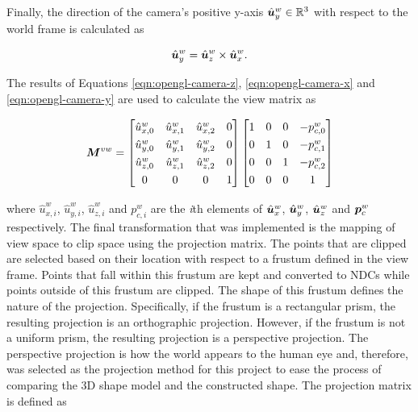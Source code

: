 Finally, the direction of the camera's positive y-axis $\hat{\bm{u}}^w_y\in\mathbb{R}^3$ with respect to the world frame is calculated as

\begin{equation}
	\hat{\bm{u}}^w_y=\hat{\bm{u}}^w_z\times\hat{\bm{u}}^w_x.
	\label{eqn:opengl-camera-y}
\end{equation}

The results of Equations \ref{eqn:opengl-camera-z}, \ref{eqn:opengl-camera-x} and \ref{eqn:opengl-camera-y} are used to calculate the view matrix as

\begin{equation}
	\renewcommand*{\arraystretch}{1.3}
	\matr{M}^{vw}=
	\begin{bmatrix}
		\hat{u}^w_{x,0} & \hat{u}^w_{x,1} & \hat{u}^w_{x,2} & 0 \\
		\hat{u}^w_{y,0} & \hat{u}^w_{y,1} & \hat{u}^w_{y,2} & 0 \\
		\hat{u}^w_{z,0} & \hat{u}^w_{z,1} & \hat{u}^w_{z,2} & 0 \\
		0 & 0 & 0 & 1
	\end{bmatrix}
	\begin{bmatrix}
		1 & 0 & 0 & -p^w_{c,0} \\
		0 & 1 & 0 & -p^w_{c,1} \\
		0 & 0 & 1 & -p^w_{c,2} \\
		0 & 0 & 0 & 1
	\end{bmatrix}
\end{equation}

where $\hat{u}^w_{x,i}$, $\hat{u}^w_{y,i}$, $\hat{u}^w_{z,i}$ and $p^w_{c,i}$ are the \textit{i}th elements of $\hat{\bm{u}}^w_{x}$, $\hat{\bm{u}}^w_{y}$, $\hat{\bm{u}}^w_{z}$ and $\bm{p}^w_{c}$ respectively. The final transformation that was implemented is the mapping of view space to clip space using the projection matrix. The points that are clipped are selected based on their location with respect to a frustum defined in the view frame. Points that fall within this frustum are kept and converted to NDCs while points outside of this frustum are clipped. The shape of this frustum defines the nature of the projection. Specifically, if the frustum is a rectangular prism, the resulting projection is an orthographic projection. However, if the frustum is not a uniform prism, the resulting projection is a perspective projection. The perspective projection is how the world appears to the human eye and, therefore, was selected as the projection method for this project to ease the process of comparing the 3D shape model and the constructed shape. The projection matrix is defined as

